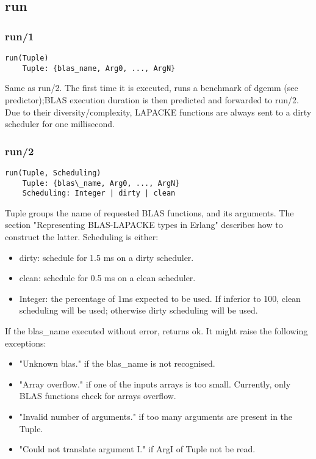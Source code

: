 \documentclass{article}
\begin{document}
    \subsection{run}
        \subsubsection{run/1}
        \begin{verbatim}
run(Tuple)
    Tuple: {blas_name, Arg0, ..., ArgN}
        \end{verbatim}
        Same as run/2. The first time it is executed, runs a benchmark of dgemm (see predictor);BLAS  execution duration is then predicted and forwarded to run/2.
        Due to their diversity/complexity, LAPACKE functions are always sent to a dirty scheduler for one millisecond.

        \subsubsection{run/2}
        \begin{verbatim}
run(Tuple, Scheduling)
    Tuple: {blas\_name, Arg0, ..., ArgN}
    Scheduling: Integer | dirty | clean
        \end{verbatim}
        Tuple groups the name of requested BLAS functions, and its arguments. The section "Representing BLAS-LAPACKE types in Erlang" describes how to construct the latter.
        Scheduling is either:
        \begin{itemize}
            \item dirty: schedule for 1.5 ms on a dirty scheduler.
            \item clean: schedule for 0.5 ms on a clean scheduler.
            \item Integer: the percentage of 1ms expected to be used. If inferior to 100, clean scheduling will be used; otherwise dirty scheduling will be used.
        \end{itemize}

        If the blas\_name executed without error, returns ok. It might raise the following exceptions:
        \begin{itemize}
            \item "Unknown blas." if the blas\_name is not recognised.
            \item "Array overflow." if one of the inputs arrays is too small. Currently, only BLAS functions check for arrays overflow.
            \item "Invalid number of arguments." if too many arguments are present in the Tuple.
            \item "Could not translate argument I." if ArgI of Tuple not be read.
        \end{itemize}
    
\end{document}
